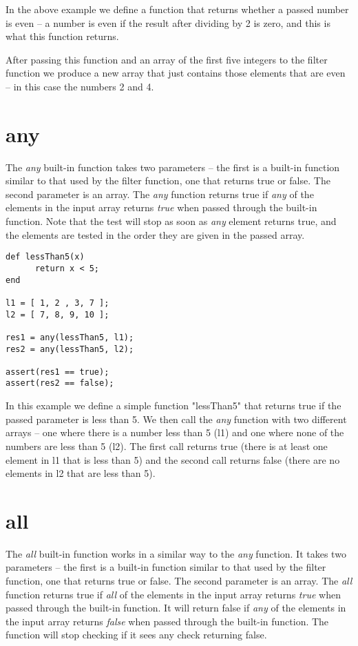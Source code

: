 In the above example we define a function that returns whether a passed number is even -- a number is even if the result after dividing by 2 is zero, and this is what this function returns.

After passing this function and an array of the first five integers to the filter function we produce a new array that just contains those elements that are even -- in this case the numbers 2 and 4.

\section{any}
The \emph{any} built-in function takes two parameters -- the first is a built-in function similar to that used by the filter function, one that returns true or false. The second parameter is an array. The \emph{any} function returns true if \emph{any} of the elements in the input array returns \emph{true} when passed through the built-in function. Note that the test will stop as soon as \emph{any} element returns true, and the elements are tested in the order they are given in the passed array.

\begin{lstlisting}[caption={Reflex any function}]
def lessThan5(x)
      return x < 5;
end

l1 = [ 1, 2 , 3, 7 ];
l2 = [ 7, 8, 9, 10 ];

res1 = any(lessThan5, l1);
res2 = any(lessThan5, l2);

assert(res1 == true);
assert(res2 == false);
\end{lstlisting}

In this example we define a simple function "lessThan5" that returns true if the passed parameter is less than 5. We then call the \emph{any} function with two different arrays -- one where there is a number less than 5 (l1) and one where none of the numbers are less than 5 (l2). The first call returns true (there is at least one element in l1 that is less than 5) and the second call returns false (there are no elements in l2 that are less than 5).

\section{all}
The \emph{all} built-in function works in a similar way to the \emph{any} function. It takes two parameters -- the first is a built-in function similar to that used by the filter function, one that returns true or false. The second parameter is an array. The \emph{all} function returns true if \emph{all} of the elements in the input array returns \emph{true} when passed through the built-in function. It will return false if \emph{any} of the elements in the input array returns \emph{false} when passed through the built-in function. The function will stop checking if it sees any check returning false.


